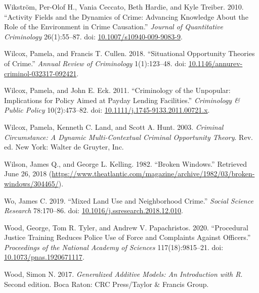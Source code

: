 \documentclass [11pt, proquest] {uwthesis}[2015/03/03]
\newlength{\cslhangindent}
\newenvironment{CSLReferences}[2]%
{\setlength{\parindent}{0pt}%
\everypar{\setlength{\hangindent}{\cslhangindent}}\ignorespaces}%
{\par}
\begin{document}
\begin{CSLReferences}{1}{0}
\leavevmode\hypertarget{ref-wikstromActivityFieldsDynamics2010}{}%
Wikström, Per-Olof H., Vania Ceccato, Beth Hardie, and Kyle Treiber. 2010. {``Activity {Fields} and the {Dynamics} of {Crime}: {Advancing Knowledge About} the {Role} of the {Environment} in {Crime Causation}.''} \emph{Journal of Quantitative Criminology} 26(1):55--87. doi: \href{https://doi.org/10.1007/s10940-009-9083-9}{10.1007/s10940-009-9083-9}.

\leavevmode\hypertarget{ref-wilcoxSituationalOpportunityTheories2018}{}%
Wilcox, Pamela, and Francis T. Cullen. 2018. {``Situational {Opportunity Theories} of {Crime}.''} \emph{Annual Review of Criminology} 1(1):123--48. doi: \href{https://doi.org/10.1146/annurev-criminol-032317-092421}{10.1146/annurev-criminol-032317-092421}.

\leavevmode\hypertarget{ref-wilcoxCriminologyUnpopularImplications2011}{}%
Wilcox, Pamela, and John E. Eck. 2011. {``Criminology of the Unpopular: {Implications} for Policy Aimed at Payday Lending Facilities.''} \emph{Criminology \& Public Policy} 10(2):473--82. doi: \href{https://doi.org/10.1111/j.1745-9133.2011.00721.x}{10.1111/j.1745-9133.2011.00721.x}.

\leavevmode\hypertarget{ref-wilcoxCriminalCircumstanceDynamic2003}{}%
Wilcox, Pamela, Kenneth C. Land, and Scott A. Hunt. 2003. \emph{Criminal {Circumstance}: {A Dynamic Multi}-{Contextual Criminal Opportunity Theory}}. Rev. ed. {New York}: {Walter de Gruyter, Inc}.

\leavevmode\hypertarget{ref-wilsonBrokenWindows1982}{}%
Wilson, James Q., and George L. Kelling. 1982. {``Broken {Windows}.''} Retrieved June 26, 2018 (\url{https://www.theatlantic.com/magazine/archive/1982/03/broken-windows/304465/}).

\leavevmode\hypertarget{ref-woMixedLandUse2019}{}%
Wo, James C. 2019. {``Mixed Land Use and Neighborhood Crime.''} \emph{Social Science Research} 78:170--86. doi: \href{https://doi.org/10.1016/j.ssresearch.2018.12.010}{10.1016/j.ssresearch.2018.12.010}.

\leavevmode\hypertarget{ref-woodProceduralJusticeTraining2020}{}%
Wood, George, Tom R. Tyler, and Andrew V. Papachristos. 2020. {``Procedural Justice Training Reduces Police Use of Force and Complaints Against Officers.''} \emph{Proceedings of the National Academy of Sciences} 117(18):9815--21. doi: \href{https://doi.org/10.1073/pnas.1920671117}{10.1073/pnas.1920671117}.

\leavevmode\hypertarget{ref-woodGeneralizedAdditiveModels2017}{}%
Wood, Simon N. 2017. \emph{Generalized {Additive Models}: {An Introduction} with {R}}. Second edition. {Boca Raton}: {CRC Press/Taylor \& Francis Group}.


\end{CSLReferences}
\end{document}
